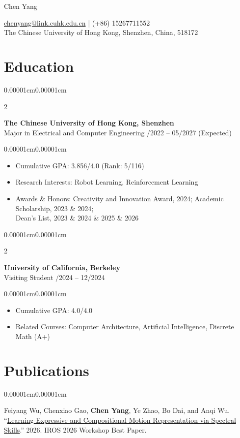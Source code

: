 \documentclass[10pt,letterpaper]{article}
\newenvironment{highlights}{\begin{itemize}[topsep=0.09cm,parsep=0pt,partopsep=0pt,itemsep=0.04cm,leftmargin=0.4cm]}{\end{itemize}}
\newenvironment{onecolentry}{\begin{adjustwidth}{0.00001cm}{0.00001cm}}{\end{adjustwidth}}
\newenvironment{twocolentry}[2][]{%
  \onecolentry
  \def\secondColumn{#2}
  \setcolumnwidth{\fill,3.7cm}
  \begin{paracol}{2}
}{%
  \switchcolumn\raggedleft\secondColumn
  \end{paracol}
  \endonecolentry
}
\newenvironment{header}{\setlength{\topsep}{0pt}\par\kern\topsep\centering\linespread{1.5}}{\par\kern\topsep}
\begin{document}
\begin{header}
  \fontsize{25pt}{25pt}\selectfont Chen Yang

  \vspace{5pt}
  \normalsize
  \href{mailto:chenyang@link.cuhk.edu.cn}{chenyang@link.cuhk.edu.cn}
  \quad|\quad
  (+86) 15267711552\\
  The Chinese University of Hong Kong, Shenzhen, China, 518172
\end{header}

\vspace{0.08cm}

\section{Education}
\begin{twocolentry}{09/2022 -- 05/2027 (Expected)}
  \textbf{The Chinese University of Hong Kong, Shenzhen}\\
  Major in Electrical and Computer Engineering
\end{twocolentry}
\begin{onecolentry}
  \begin{highlights}
    \item Cumulative GPA: 3.856/4.0 (Rank: 5/116)
    \item Research Interests: Robot Learning, Reinforcement Learning
    \item Awards \& Honors: Creativity and Innovation Award, 2024; Academic Scholarship, 2023 \& 2024;\\
      Dean's List, 2023 \& 2024 \& 2025 \& 2026
  \end{highlights}
\end{onecolentry}
\vspace{0.12cm}
\begin{twocolentry}{09/2024 -- 12/2024}
  \textbf{University of California, Berkeley}\\
  Visiting Student
\end{twocolentry}
\begin{onecolentry}
  \begin{highlights}
    \item Cumulative GPA: 4.0/4.0
    \item Related Courses: Computer Architecture, Artificial Intelligence, Discrete Math (A+)
  \end{highlights}
\end{onecolentry}

\section{Publications}
\begin{onecolentry}
  \begin{enumerate}[label={[\arabic*]},leftmargin=0.55cm,topsep=0.03cm,parsep=0pt,itemsep=0.04cm]
    \item Feiyang Wu, Chenxiao Gao, \textbf{Chen Yang}, Ye Zhao, Bo Dai, and Anqi Wu. ``\href{https://arxiv.org/abs/2609.37677}{Learning Expressive and Compositional Motion Representation via Spectral Skills}.'' 2026. IROS 2026 Workshop Best Paper.
  \end{enumerate}
\end{onecolentry}
\end{document}
